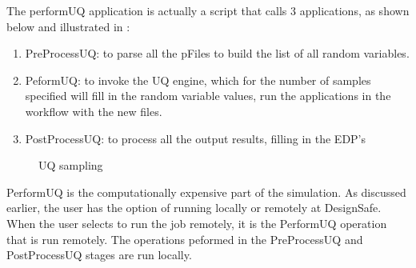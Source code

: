 The performUQ application is actually a script that calls 3
applications, as shown below and illustrated in :
\begin{enumerate}
\item PreProcessUQ: to  parse all the pFiles to build the
  list of all random variables.
\item PeformUQ: to invoke the UQ engine, which for the number of
  samples specified will fill in the random variable values, run the
  applications in the workflow with the new files.
\item PostProcessUQ: to process all the output results, filling in
  the EDP’s
\end{enumerate}

\begin{figure}[!htbp]
  \caption{UQ sampling}
  \label{fig:uq_sampling}
\end{figure}

PerformUQ is the computationally expensive part of the simulation.  As
discussed earlier, the user has the option of running locally or
remotely at DesignSafe. When the user selects to run the job remotely,
it is the PerformUQ operation that is run remotely. The operations
peformed in the PreProcessUQ and PostProcessUQ stages are run locally.
